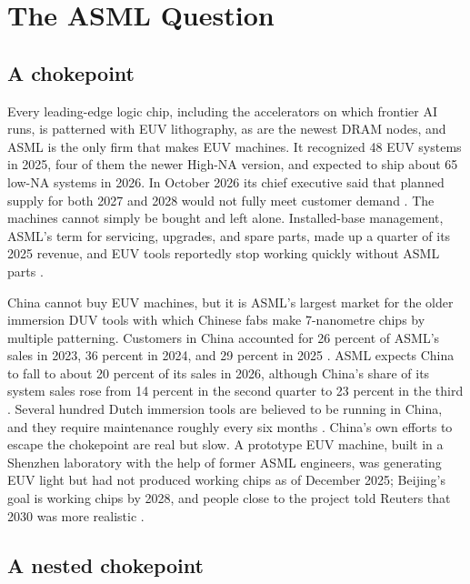 \section{The ASML Question}\label{sec:background}

\subsection{A chokepoint}

Every leading-edge logic chip, including the accelerators on which frontier AI runs, is patterned with EUV lithography, as are the newest DRAM nodes, and ASML is the only firm that makes EUV machines. It recognized 48 EUV systems in 2025, four of them the newer High-NA version, and expected to ship about 65 low-NA systems in 2026. In October 2026 its chief executive said that planned supply for both 2027 and 2028 would not fully meet customer demand \citep{asml2026q3}. The machines cannot simply be bought and left alone. Installed-base management, ASML's term for servicing, upgrades, and spare parts, made up a quarter of its 2025 revenue, and EUV tools reportedly stop working quickly without ASML parts \citep{asml2026annual, bloomberg2024disable}.

China cannot buy EUV machines, but it is ASML's largest market for the older immersion DUV tools with which Chinese fabs make 7-nanometre chips by multiple patterning. Customers in China accounted for 26 percent of ASML's sales in 2023, 36 percent in 2024, and 29 percent in 2025 \citep{asml2026annual}. ASML expects China to fall to about 20 percent of its sales in 2026, although China's share of its system sales rose from 14 percent in the second quarter to 23 percent in the third \citep{asml2026q2call, asml2026q3}. Several hundred Dutch immersion tools are believed to be running in China, and they require maintenance roughly every six months \citep{aei2026lithography}. China's own efforts to escape the chokepoint are real but slow. A prototype EUV machine, built in a Shenzhen laboratory with the help of former ASML engineers, was generating EUV light but had not produced working chips as of December 2025; Beijing's goal is working chips by 2028, and people close to the project told Reuters that 2030 was more realistic \citep{reuters2025euv}.

\subsection{A nested chokepoint}

